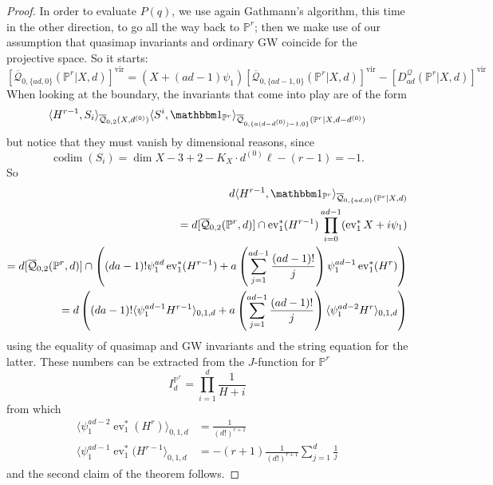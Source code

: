 \documentclass[11pt]{amsart}
\newcommand{\Q}[4]{\overline{\mathcal Q}_{#1,#2}(#3,#4)}
\newcommand{\PP}{\mathbb P}
\newcommand{\ev}{\operatorname{ev}}
\newcommand{\codim}{\operatorname{codim}}
\theoremstyle{plain}
\theoremstyle{definition}
\begin{document}
\begin{proof}
In order to evaluate $P(q)$, we use again Gathmann's algorithm, this time in the other direction, to go all the way back to $\PP^r$; then we make use of our assumption that quasimap invariants and ordinary GW coincide for the projective space. So it starts:
\[
 [\Q{0}{\{ad,0\}}{\PP^r|X}{d}]^\text{vir}=(X+(ad-1)\psi_1)[\Q{0}{\{ad-1,0\}}{\PP^r|X}{d}]^\text{vir}-[D_{ad}^{\mathcal Q}(\PP^r|X,d)]^\text{vir}
\]
When looking at the boundary, the invariants that come into play are of the form
\[
 \langle H^{r-1},S_i\rangle_{\Q{0}{2}{X}{d^{(0)}}}\langle S^i,\mathbbm 1_{\PP^r}\rangle_{\Q{0}{\{a(d-d^{(0)})-1,0\}}{\PP^r|X}{d-d^{(0)}}}
\]
but notice that they must vanish by dimensional reasons, since
\[
 \codim(S_i)=\dim X-3+2-K_X\cdot d^{(0)}\ell-(r-1)=-1.
\]
So
\begin{align*} 
 d\langle H^{r-1},\mathbbm 1_{\PP^r}\rangle_{\Q{0}{\{ad,0\}}{\PP^r|X}{d}} \\ 
 = d[\Q{0}{2}{\PP^r}{d}]\cap\ev_1^*(H^{r-1})\prod_{i=0}^{ad-1}(\ev_1^*X+i\psi_1) \\ 
 = d[\Q{0}{2}{\PP^r}{d}]\cap\left((da-1)!\psi_1^{ad}\ev_1^*(H^{r-1})+a\left(\sum_{j=1}^{ad-1}\frac{(ad-1)!}{j}\right)\psi_1^{ad-1}\ev_1^*(H^{r})\right) \\ 
 = d\left((da-1)!\langle \psi_1^{ad-1}H^{r-1}\rangle_{0,1,d}+a\left(\sum_{j=1}^{ad-1}\frac{(ad-1)!}{j}\right)\langle\psi_1^{ad-2}H^{r}\rangle_{0,1,d}\right) 
\end{align*}
using the equality of quasimap and GW invariants and the string equation for the latter. These numbers can be extracted from the $J$-function for $\PP^r$
\[
 I^{\PP^r}_d=\prod_{i=1}^d\frac{1}{H+i}
\]
from which
\begin{align*}
 \langle \psi_1^{ad-2}\ev_1^*(H^{r})\rangle_{0,1,d} &=\frac{1}{(d!)^{r+1}} \\
 \langle \psi_1^{ad-1}\ev_1^*(H^{r-1}\rangle_{0,1,d} &=-(r+1)\frac{1}{(d!)^{r+1}}\sum_{j=1}^d\frac{1}{j}
\end{align*}
and the second claim of the theorem follows.
\end{proof}



\end{document}

